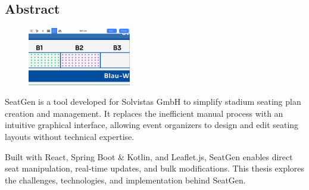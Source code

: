 \begin{spacing}{1}
    \chapter*{Abstract}
\end{spacing}
\begin{figure}
    \begin{center}
      \includegraphics[width=0.4\textwidth]{pics/abstract.png}
    \end{center}
\end{figure}
SeatGen is a tool developed for Solvistas GmbH to simplify stadium seating plan creation and management. It replaces the inefficient manual process with an intuitive graphical interface, allowing event organizers to design and edit seating layouts without technical expertise.

Built with React, Spring Boot \& Kotlin, and Leaflet.js, SeatGen enables direct seat manipulation, real-time updates, and bulk modifications. This thesis explores the challenges, technologies, and implementation behind SeatGen.
\newpage